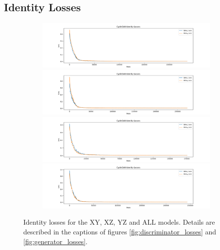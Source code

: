 \documentclass[11pt, fleqn, titlepage]{article}
\newcommand{\1}[1]{\mathds{1}\left[#1\right]}
\begin{document}
\subsection{Identity Losses}\label{iden_loss}
\begin{figure}[H]
	\centering
	\begin{subfigure}[b]{0.8\textwidth}
		\centering
		\includegraphics[width=\linewidth]{imgs/identity_losses/XY_model_identity_losses}
		\hfill
		\includegraphics[width=\linewidth]{imgs/identity_losses/XZ_model_identity_losses}
		\hfill
		\includegraphics[width=\linewidth]{imgs/identity_losses/YZ_model_identity_losses}
		\hfill
		\includegraphics[width=\linewidth]{imgs/identity_losses/ALL_model_identity_losses}
	\end{subfigure}
	\caption{Identity losses for the XY, XZ, YZ and ALL models. Details are described in the captions of figures \ref{fig:discriminator_losses} and \ref{fig:generator_losses}.}
	\label{fig:cycle_losses}
\end{figure}
\end{document}
